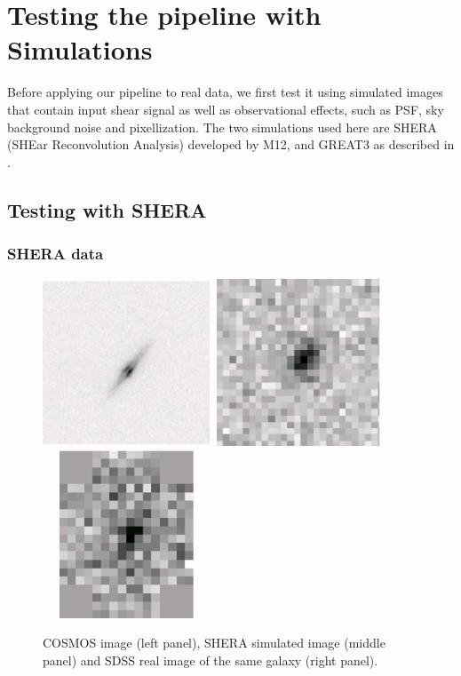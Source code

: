\documentclass[apj]{emulateapj}
\begin{document}
\section{Testing the pipeline with Simulations}
\label{sec_test}

Before applying our pipeline to real data, we first test it using
simulated images that contain input shear signal as well as 
observational effects, such as PSF, sky background noise and 
pixellization. The two simulations used here are SHERA (SHEar
Reconvolution Analysis) developed by M12, and 
GREAT3 as described in \citep{Mandelbaum2014}.

\subsection{Testing with SHERA}

\subsubsection{SHERA data}

\begin{figure}
\centering
\includegraphics[width=5cm,height=5cm]{f1a.eps}
\includegraphics[width=5cm,height=5cm]{f1b.eps}
\includegraphics[width=5cm,height=5cm]{f1c.eps}
\caption{COSMOS image (left panel),
  SHERA simulated image (middle panel) and SDSS real image of the
  same galaxy (right panel).}
  \label{fig:image}
\end{figure}
\end{document}
